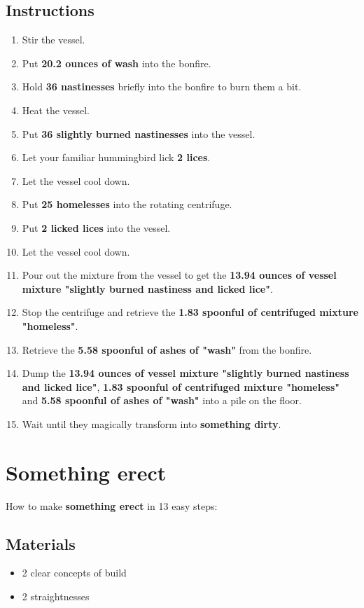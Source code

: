 \documentclass{article}
\begin{document}
\subsection{Instructions}\begin{enumerate}
\item 
Stir the vessel.
\item 
Put \textbf{20.2 ounces of wash} into the bonfire.
\item 
Hold \textbf{36 nastinesses} briefly into the bonfire to burn them a bit.
\item 
Heat the vessel.
\item 
Put \textbf{36 slightly burned nastinesses} into the vessel.
\item 
Let your familiar hummingbird lick \textbf{2 lices}.
\item 
Let the vessel cool down.
\item 
Put \textbf{25 homelesses} into the rotating centrifuge.
\item 
Put \textbf{2 licked lices} into the vessel.
\item 
Let the vessel cool down.
\item 
Pour out the mixture from the vessel to get the \textbf{13.94 ounces of vessel mixture "slightly burned nastiness and licked lice"}.
\item 
Stop the centrifuge and retrieve the \textbf{1.83 spoonful of centrifuged mixture "homeless"}.
\item 
Retrieve the \textbf{5.58 spoonful of ashes of "wash"} from the bonfire.
\item 
Dump the \textbf{13.94 ounces of vessel mixture "slightly burned nastiness and licked lice"}, \textbf{1.83 spoonful of centrifuged mixture "homeless"} and \textbf{5.58 spoonful of ashes of "wash"} into a pile on the floor.
\item 
Wait until they magically transform into \textbf{something dirty}.
\end{enumerate}
\newpage
\section{Something erect}How to make \textbf{something erect} in 13 easy steps:

\subsection{Materials}\begin{itemize}
\item 
2 clear concepts of build
\item 
2 straightnesses
\end{itemize}
\end{document}
